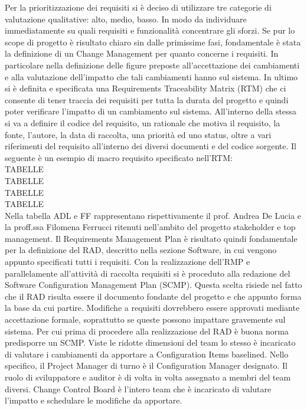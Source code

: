 Per la prioritizzazione dei requisiti si è deciso di utilizzare tre categorie di valutazione qualitative: alto, medio, basso. In modo da individuare immediatamente su quali requisiti e funzionalità concentrare gli sforzi. 
Se pur lo scope di progetto è risultato chiaro sin dalle primissime fasi, fondamentale è stata la definizione di un Change Management per quanto concerne i requisiti. In particolare nella definizione delle figure preposte all’accettazione dei cambiamenti e alla valutazione dell’impatto che tali cambiamenti hanno sul sistema.
In ultimo si è definita e specificata una Requirements Traceability Matrix (RTM) che ci consente di tener traccia dei requisiti per tutta la durata del progetto e quindi poter verificare l’impatto di un cambiamento sul sistema. 
All’interno della stessa si va a definire il codice del requisito, un rationale che motiva il requisito, la fonte, l’autore, la data di raccolta, una priorità ed uno status, oltre a vari riferimenti del requisito all’interno dei diversi documenti e del codice sorgente.
Il seguente è un esempio di macro requisito specificato nell’RTM:
\\
TABELLE
\\
TABELLE
\\
TABELLE
\\
TABELLE
\\
Nella tabella ADL e FF rappresentano rispettivamente il prof. Andrea De Lucia e la proff.ssa Filomena Ferrucci ritenuti nell’ambito del progetto stakeholder e top management.
Il Requirements Management Plan è risultato quindi fondamentale per la definizione del RAD, descritto nella sezione Software, in cui vengono appunto specificati tutti i requisiti.
Con la realizzazione dell’RMP e parallelamente all’attività di raccolta requisiti si è proceduto alla redazione del Software Configuration Management Plan (SCMP). Questa scelta risiede nel fatto che il RAD risulta essere il documento fondante del progetto e che appunto forma la base da cui partire. Modifiche a requisiti dovrebbero essere approvati mediante accettazione formale, soprattutto se queste possono impattare gravemente sul sistema.
Per cui prima di procedere alla realizzazione del RAD è buona norma predisporre un SCMP. 
Viste le ridotte dimensioni del team lo stesso è incaricato di valutare i cambiamenti da apportare a Configuration Items baselined.
Nello specifico, il Project Manager di turno è il Configuration Manager designato. Il ruolo di sviluppatore e auditor è di volta in volta assegnato a membri del team diversi.
Change Control Board è l’intero team che è incaricato di valutare l’impatto e schedulare le modifiche da apportare.
